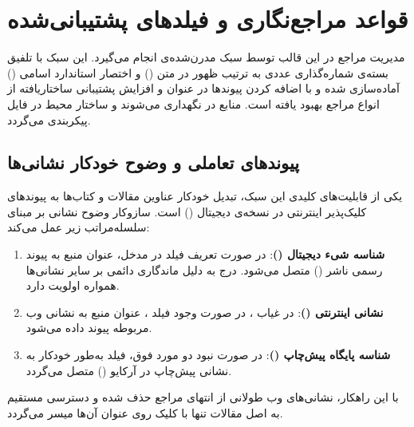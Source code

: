 

\section{قواعد مراجع‌نگاری و فیلدهای پشتیبانی‌شده}\label{sec:app_bibliography_rules}

مدیریت مراجع در این قالب توسط سبک مدرن‌شده‌ی  انجام می‌گیرد. این سبک با تلفیق بسته‌ی شماره‌گذاری عددی به ترتیب ظهور در متن () و اختصار استاندارد اسامی () آماده‌سازی شده و با اضافه کردن پیوندها در عنوان و افزایش پشتیبانی ساختاریافته از انواع مراجع بهبود یافته است. منابع در  نگهداری می‌شوند و ساختار محیط در فایل  پیکربندی می‌گردد.


\subsection{پیوندهای تعاملی و وضوح خودکار نشانی‌ها}

یکی از قابلیت‌های کلیدی این سبک، تبدیل خودکار عناوین مقالات و کتاب‌ها به پیوندهای کلیک‌پذیر اینترنتی در نسخه‌ی دیجیتال () است. سازوکار وضوح نشانی بر مبنای سلسله‌مراتب زیر عمل می‌کند:
\begin{enumerate}
    \item \textbf{شناسه شیء دیجیتال ()}: در صورت تعریف فیلد  در مدخل، عنوان منبع به پیوند رسمی ناشر () متصل می‌شود. درج  به دلیل ماندگاری دائمی بر سایر نشانی‌ها همواره اولویت دارد.
    \item \textbf{نشانی اینترنتی ()}: در غیاب ، در صورت وجود فیلد ، عنوان منبع به نشانی وب مربوطه پیوند داده می‌شود.
    \item \textbf{شناسه پایگاه پیش‌چاپ ()}: در صورت نبود دو مورد فوق، فیلد  به‌طور خودکار به نشانی پیش‌چاپ در آرکایو () متصل می‌گردد.
\end{enumerate}
با این راهکار، نشانی‌های وب طولانی از انتهای مراجع حذف شده و دسترسی مستقیم به اصل مقالات تنها با کلیک روی عنوان آن‌ها میسر می‌گردد.


